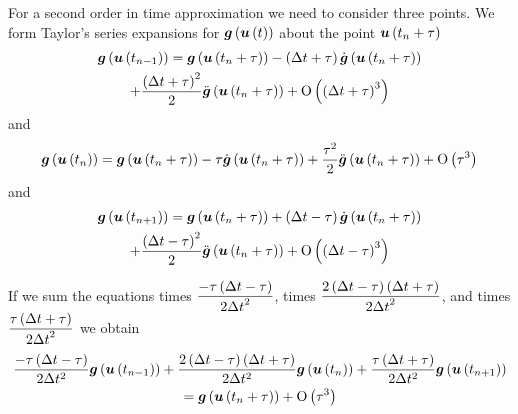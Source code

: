 For a second order in time approximation we need to consider three points. We form Taylor's series expansions for
$  \boldsymbol{g} \left(   \boldsymbol{u} \left( t \right)  \right) $ about the point $  \boldsymbol{u} \left( t_{n}+\tau \right) $ \ie
\begin{multline}
  \fnof{\vectr{g}}{\fnof{\vectr{u}}{t_{n-1}}}=\fnof{\vectr{g}}{\fnof{\vectr{u}}{t_{n}+\tau}}
  - \pbrac{\Delta t+\tau}\fnof{\dot{\vectr{g}}}{\fnof{\vectr{u}}{t_{n}+\tau}} \\
  + \dfrac{\pbrac{\Delta t+\tau}^{2}}{2}\fnof{\ddot{\vectr{g}}}{\fnof{\vectr{u}}{t_{n}+\tau}}
  + \orderof{\pbrac{\Delta t+\tau}^{3}}
  \label{eqn:secondorderpreviousTaylorexpansion}
\end{multline}
and
\begin{equation}
  \fnof{\vectr{g}}{\fnof{\vectr{u}}{t_{n}}}=\fnof{\vectr{g}}{\fnof{\vectr{u}}{t_{n}+\tau}}
  - \tau\fnof{\dot{\vectr{g}}}{\fnof{\vectr{u}}{t_{n}+\tau}}
  + \dfrac{\tau^{2}}{2}\fnof{\ddot{\vectr{g}}}{\fnof{\vectr{u}}{t_{n}+\tau}}
  + \orderof{\tau^{3}}
  \label{eqn:secondordercurrentTaylorexpansion}
\end{equation}
and
\begin{multline}
  \fnof{\vectr{g}}{\fnof{\vectr{u}}{t_{n+1}}}=\fnof{\vectr{g}}{\fnof{\vectr{u}}{t_{n}+\tau}}
  + \pbrac{\Delta t-\tau}\fnof{\dot{\vectr{g}}}{\fnof{\vectr{u}}{t_{n}+\tau}} \\
  + \dfrac{\pbrac{\Delta t-\tau}^{2}}{2}\fnof{\ddot{\vectr{g}}}{\fnof{\vectr{u}}{t_{n}+\tau}}
  + \orderof{\pbrac{\Delta t-\tau}^{3}}
  \label{eqn:secondordernextTaylorexpansion}
\end{multline}

If we sum the equations  times
$\dfrac{-\tau\left( \Delta t - \tau \right)}{2{\Delta t}^{2}}$,
 times
$\dfrac{2\left( \Delta t - \tau \right)\left( \Delta t + \tau \right)}{2{\Delta t}^{2}}$, and
 times
$\dfrac{\tau\left( \Delta t + \tau \right)}{2{\Delta t}^{2}}$ we obtain
\begin{multline}
  \dfrac{-\tau\left( \Delta t - \tau \right)}{2\Delta
    t^{2}}  \boldsymbol{g} \left(   \boldsymbol{u} \left( t_{n-1} \right)  \right) +
  \dfrac{2\left( \Delta t - \tau \right)\left( \Delta t + \tau \right)}{2\Delta
    t^{2}}  \boldsymbol{g} \left(   \boldsymbol{u} \left( t_{n} \right)  \right) +
  \dfrac{\tau\left( \Delta t + \tau \right)}{2\Delta
    t^{2}}  \boldsymbol{g} \left(   \boldsymbol{u} \left( t_{n+1} \right)  \right) \\
  =  \boldsymbol{g} \left(   \boldsymbol{u} \left( t_{n}+\tau \right)  \right) +
   \mathrm{O}\left( \tau^{3} \right) 
\end{multline}


